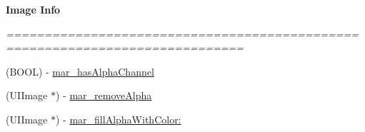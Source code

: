 \begin{Indent}\textbf{ Image Info}\par
{\em ============================================================================= 

 }\begin{DoxyCompactItemize}
\item 
(B\+O\+OL) -\/ \hyperlink{category_u_i_image_07_m_a_r_e_x_08_aaa533f9e0fc0daba1009929f7deaf8ae}{mar\+\_\+has\+Alpha\+Channel}
\item 
(U\+I\+Image $\ast$) -\/ \hyperlink{category_u_i_image_07_m_a_r_e_x_08_a85b26769b4054507083a31c2b40eafc0}{mar\+\_\+remove\+Alpha}
\item 
(U\+I\+Image $\ast$) -\/ \hyperlink{category_u_i_image_07_m_a_r_e_x_08_abc0ff7c1945d68d54dd83940183fcded}{mar\+\_\+fill\+Alpha\+With\+Color\+:}
\end{DoxyCompactItemize}
\end{Indent}
